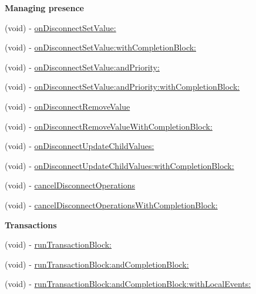 \begin{Indent}{\bf Managing presence}\par
\begin{DoxyCompactItemize}
\item 
(void) -\/ \hyperlink{interface_f_i_r_database_reference_af94d94420e8246aa3f21452fac912adf}{on\+Disconnect\+Set\+Value\+:}
\item 
(void) -\/ \hyperlink{interface_f_i_r_database_reference_af1dce366201e9dac1a0d21bb0e75f3d7}{on\+Disconnect\+Set\+Value\+:with\+Completion\+Block\+:}
\item 
(void) -\/ \hyperlink{interface_f_i_r_database_reference_abd908867eef338d35445bc41631daa98}{on\+Disconnect\+Set\+Value\+:and\+Priority\+:}
\item 
(void) -\/ \hyperlink{interface_f_i_r_database_reference_a95f41a8df796f900a74c730fc25ee3f4}{on\+Disconnect\+Set\+Value\+:and\+Priority\+:with\+Completion\+Block\+:}
\item 
(void) -\/ \hyperlink{interface_f_i_r_database_reference_a66f5f6d8b9efb5312dd77b1e18da668e}{on\+Disconnect\+Remove\+Value}
\item 
(void) -\/ \hyperlink{interface_f_i_r_database_reference_a62db39e6e90279513fbc25edf54b3b55}{on\+Disconnect\+Remove\+Value\+With\+Completion\+Block\+:}
\item 
(void) -\/ \hyperlink{interface_f_i_r_database_reference_a19424f2d0161b403236adf8e1cccae0b}{on\+Disconnect\+Update\+Child\+Values\+:}
\item 
(void) -\/ \hyperlink{interface_f_i_r_database_reference_ab89e6f33603a68d59bf40f1f9e8d08de}{on\+Disconnect\+Update\+Child\+Values\+:with\+Completion\+Block\+:}
\item 
(void) -\/ \hyperlink{interface_f_i_r_database_reference_a1c895132fd4173a55c8213335bde1321}{cancel\+Disconnect\+Operations}
\item 
(void) -\/ \hyperlink{interface_f_i_r_database_reference_aa0625a6b3ece3675a839303de8df86a8}{cancel\+Disconnect\+Operations\+With\+Completion\+Block\+:}
\end{DoxyCompactItemize}
\end{Indent}
\begin{Indent}{\bf Transactions}\par
\begin{DoxyCompactItemize}
\item 
(void) -\/ \hyperlink{interface_f_i_r_database_reference_a796bff455159479a44b225eeaa2ba9d6}{run\+Transaction\+Block\+:}
\item 
(void) -\/ \hyperlink{interface_f_i_r_database_reference_adb284b82bb68ad3490c83d4deb057ecd}{run\+Transaction\+Block\+:and\+Completion\+Block\+:}
\item 
(void) -\/ \hyperlink{interface_f_i_r_database_reference_aa0dff03c23065c88d36149bf89cd4cfe}{run\+Transaction\+Block\+:and\+Completion\+Block\+:with\+Local\+Events\+:}
\end{DoxyCompactItemize}
\end{Indent}
